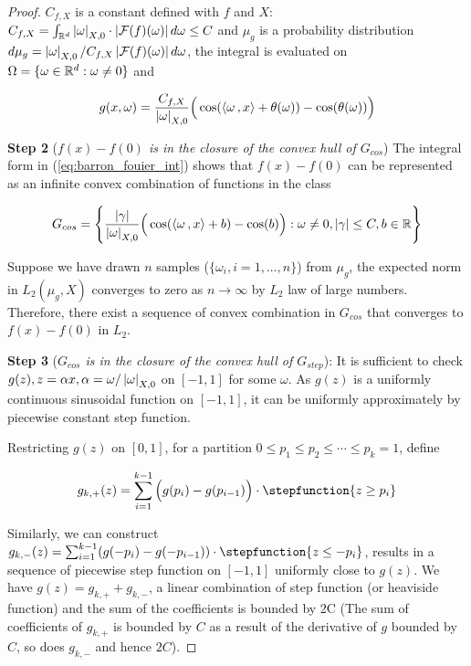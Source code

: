 \begin{proof}
    $C_{f,X}$ is a constant defined with $f$ and $X$: $C_{f,X} =
        \int_{\mathbb{R}^d} \left| \omega \right|_{X, 0} \cdot \left| \mathcal{F}(f)(\omega) \right| d\omega \leq
        C$ and $\mu_g$ is a probability distribution $d\mu_g =
        \left| \omega \right|_{X,0}/C_{f,X}\left| \mathcal{F}(f)(\omega) \right| d\omega$, the integral is
    evaluated on $\Omega = \{\omega \in \mathbb{R}^d: \omega \not = 0\}$ and

    \begin{equation}
        g(x, \omega) = \frac{C_{f,X}}{\left| \omega \right|_{X, 0}}\Big(\cos(\left\langle \omega\, , x \right\rangle + \theta(\omega)) - \cos(\theta(\omega))\Big)
    \end{equation}

    \textbf{Step 2} (\textit{$f(x) - f(0)$ is in the closure of the convex hull
        of $G_{cos}$}) The integral form in (\ref{eq:barron_fouier_int}) shows that
    $f(x) - f(0)$ can be represented as an infinite convex combination of
    functions in the class

    \begin{equation}
        G_{cos} = \Bigg\{\frac{\left| \gamma \right|}{\left| \omega \right|_{X, 0}}\Big(\cos(\left\langle \omega\, , x \right\rangle + b) - \cos(b)\Big): \omega \not= 0, \left| \gamma \right| \leq C, b \in \mathbb{R} \Bigg\}
    \end{equation}

    Suppose we have drawn $n$ samples ($\{\omega_i, i = 1,\dots, n\}$) from
    $\mu_g$, the expected norm in $L_2(\mu_g, X)$ converges to zero as $n \to
        \infty$ by $L_2$ law of large numbers. Therefore, there exist a sequence of
    convex combination in $G_{cos}$ that converges to $f(x) - f(0)$ in $L_2$.


    \textbf{Step 3} (\textit{$G_{cos}$ is in the closure of the convex hull of
        $G_{step}$}): It is sufficient to check $g(z), z = \alpha x, \alpha =
        \omega/\left| \omega \right|_{X,0}$ on $[-1, 1]$ for some $\omega$. As $g(z)$ is a
    uniformly continuous sinusoidal function on $[-1, 1]$, it can be uniformly
    approximately by piecewise constant step function.

    Restricting $g(z)$ on $[0, 1]$, for a partition ${0 \leq p_1 \leq p_2 \leq
                \cdots \leq p_k = 1}$, define

    \begin{align}
        g_{k,+}(z) = \sum_{i=1}^{k-1} \Big(g(p_i) - g(p_{i-1})\Big) \cdot
        \stepfunction{z\geq p_i}
    \end{align}

    Similarly, we can construct $g_{k,-}(z) = \sum_{i=1}^{k-1} (g(-p_i) -
        g(-p_{i-1})) \cdot \stepfunction{z\leq -p_i}$, results in a sequence of
    piecewise step function on $[-1, 1]$ uniformly close to $g(z)$. We have
    $g(z) = g_{k,+}+g_{k,-}$, a linear combination of step function (or
    heaviside function) and the sum of the coefficients is bounded by 2C (The
    sum of coefficients of $g_{k,+}$ is bounded by $C$ as a result of the
    derivative of $g$ bounded by $C$, so does $g_{k,-}$ and hence $2C$).


\end{proof}
